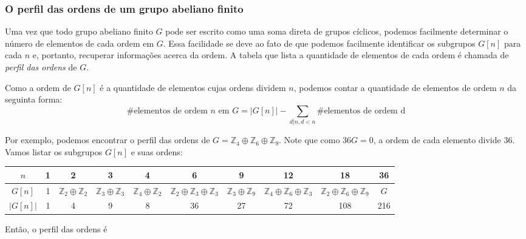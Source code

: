 \documentclass[a4paper,portuguese,11pt,twoside, leqno]{book}
\theoremstyle{definition}
\begin{document}
	\subsubsection{O perfil das ordens de um grupo abeliano finito}
	\hspace{12pt} Uma vez que todo grupo abeliano finito $G$ pode ser escrito como uma soma direta de grupos cíclicos, podemos facilmente determinar o número de elementos de cada ordem em $G$. Essa facilidade se deve ao fato de que podemos facilmente identificar os subgrupos $G[n]$ para cada $n$ e, portanto, recuperar informações acerca da ordem. A tabela que lista a quantidade de elementos de cada ordem é chamada de \textit{perfil das ordens} de $G$.
	\par\vspace{0.3cm} Como a ordem de $G[n]$ é a quantidade de elementos cujas ordens dividem $n$, podemos contar a quantidade de elementos de ordem $n$ da seguinta forma:
	\begin{equation*}
	\#\text{elementos de ordem $n$ em $G$} = |G[n]| - \sum_{d|n, d<n}\#\text{elementos de ordem d}
	\end{equation*}
	\par\vspace{0.3cm} Por exemplo, podemos encontrar o perfil das ordens de $G = \mathbb{Z}_4\oplus\mathbb{Z}_6\oplus\mathbb{Z}_9$. Note que como $36G = 0$, a ordem de cada elemento divide $36$. Vamos listar os subgrupos $G[n]$ e suas ordens:
	\begin{center}
		\begin{tabular}{|c|c|c|c|c|c|c|c|c|c|}
		\hline
		$n$ & 1 & 2 & 3 & 4 & 6 & 9 & 12 & 18 & 36 \\
		\hline 
		$G[n]$ & 1 & $\mathbb{Z}_2\oplus\mathbb{Z}_2$ & $\mathbb{Z}_3\oplus\mathbb{Z}_3$ & $\mathbb{Z}_4\oplus\mathbb{Z}_2$ & $\mathbb{Z}_2\oplus\mathbb{Z}_3\oplus\mathbb{Z}_3$ & $\mathbb{Z}_3\oplus\mathbb{Z}_9$ & $\mathbb{Z}_4\oplus\mathbb{Z}_6\oplus\mathbb{Z}_3$ & $\mathbb{Z}_2\oplus\mathbb{Z}_6\oplus\mathbb{Z}_9$ & $G$ \\
		\hline 
		$|G[n]|$ & 1 & 4 & 9 & 8 & 36 & 27 & 72 & 108 & 216 \\
		\hline
		\end{tabular}
	\end{center}
	\par\vspace{0.3cm} Então, o perfil das ordens é
\end{document}
